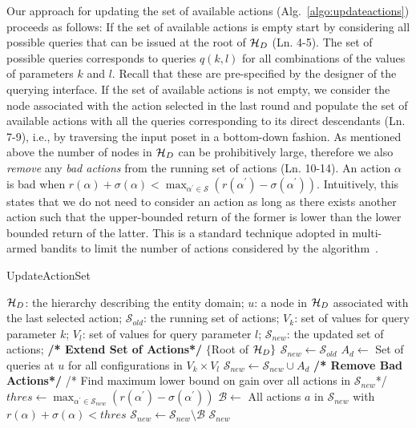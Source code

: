 Our approach for updating the set of available actions (Alg.~\ref{algo:updateactions}) proceeds as follows: If the set of available actions is empty start by considering all possible queries that can be issued at the root of $\mathcal{H}_D$ (Ln. 4-5). The set of possible queries corresponds to queries $q(k,l)$ for all combinations of the values of parameters $k$ and $l$. Recall that these are pre-specified by the designer of the querying interface. If the set of available actions is not empty, we consider the node associated with the action selected in the last round and populate the set of available actions with all the queries corresponding to its direct descendants (Ln. 7-9), i.e., by traversing the input poset in a bottom-down fashion. As mentioned above the number of nodes in $\mathcal{H}_D$ can be prohibitively large, therefore we also {\em remove} any {\em bad actions} from the running set of actions (Ln.  10-14). 
An action $\alpha$ is bad when $r(\alpha) + \sigma(\alpha) < \max_{\alpha^{\prime} \in \mathcal{S}} (r(\alpha^{\prime}) - \sigma(\alpha^{\prime}))$. Intuitively, this states that we do not need to consider an action as long as there exists another action such that the upper-bounded return of the former is lower than the lower bounded return of the latter. This is a standard technique adopted in multi-armed bandits to limit the number of actions considered by the algorithm~\cite{EvenDar06actionelimination}. 


\begin{algorithm}[h]
\small\caption{UpdateActionSet}
\label{algo:updateactions}
\begin{algorithmic}[1]
 $\mathcal{H}_D$: the hierarchy describing the entity domain; $u$: a node in $\mathcal{H}_D$ associated with the last selected action; $\mathcal{S}_{old}$: the running set of actions; $V_k$: set of values for query parameter $k$; $V_l$: set of values for query parameter $l$;
 $\mathcal{S}_{new}$: the updated set of actions;
\STATE \textbf{/* Extend Set of Actions*/}
	\RETURN $\{$Root of $\mathcal{H}_D \}$
\ENDIF 
\STATE $\mathcal{S}_{new} \leftarrow \mathcal{S}_{old}$
\STATE $A_d \leftarrow$ Set of queries at $u$ for all configurations in $V_k \times V_l$
\STATE $\mathcal{S}_{new} \leftarrow \mathcal{S}_{new} \cup A_d$
\ENDFOR
\STATE \textbf{/* Remove Bad Actions*/}
\STATE /* Find maximum lower bound on gain over all actions in $\mathcal{S}_{new}$*/
\STATE $thres \leftarrow \max_{\alpha^{\prime} \in \mathcal{S}_{new}} (r(\alpha^{\prime}) - \sigma(\alpha^{\prime}))$  
\STATE $\mathcal{B} \leftarrow$ All actions $a$ in $\mathcal{S}_{new}$ with $r(\alpha) + \sigma(\alpha) < thres$
\STATE $\mathcal{S}_{new} \leftarrow \mathcal{S}_{new} \setminus \mathcal{B}$
\RETURN $\mathcal{S}_{new}$
\end{algorithmic}
\end{algorithm}

